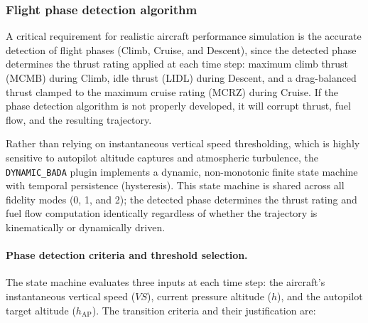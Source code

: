 \subsubsection{Flight phase detection algorithm}
\label{sec:phase_detection}
A critical requirement for realistic aircraft performance simulation is the accurate detection of flight phases (Climb, Cruise, and Descent), since the detected phase determines the thrust rating applied at each time step: maximum climb thrust (MCMB) during Climb, idle thrust (LIDL) during Descent, and a drag-balanced thrust clamped to the maximum cruise rating (MCRZ) during Cruise. If the phase detection algorithm is not properly developed, it will corrupt thrust, fuel flow, and the resulting trajectory.

Rather than relying on instantaneous vertical speed thresholding, which is highly sensitive to autopilot altitude captures and atmospheric turbulence, the \texttt{DYNAMIC\_BADA} plugin implements a dynamic, non-monotonic finite state machine with temporal persistence (hysteresis). This state machine is shared across all fidelity modes (0, 1, and 2); the detected phase determines the thrust rating and fuel flow computation identically regardless of whether the trajectory is kinematically or dynamically driven.

\paragraph{Phase detection criteria and threshold selection.}
The state machine evaluates three inputs at each time step: the aircraft's instantaneous vertical speed ($VS$), current pressure altitude ($h$), and the autopilot target altitude ($h_{\text{AP}}$). The transition criteria and their justification are:

